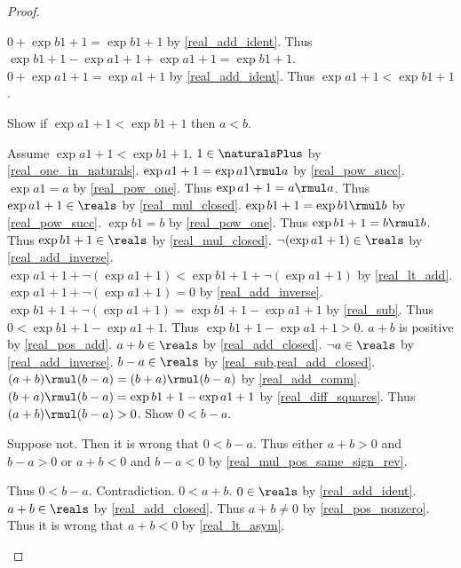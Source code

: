 \begin{proof}
\begin{subproof}
        $0 + \exp{b}{1+1} = \exp{b}{1+1}$ by \cref{real_add_ident}.
        Thus $\exp{b}{1+1} - \exp{a}{1+1} + \exp{a}{1+1} = \exp{b}{1+1}$.
        $0 + \exp{a}{1+1} = \exp{a}{1+1}$ by \cref{real_add_ident}.
        Thus $\exp{a}{1+1} < \exp{b}{1+1}$.
    \end{subproof}
    Show if $\exp{a}{1+1} < \exp{b}{1+1}$ then $a < b$.
    \begin{subproof}
        Assume $\exp{a}{1+1} < \exp{b}{1+1}$.
        $1\in\naturalsPlus$ by \cref{real_one_in_naturals}.
        $\exp{a}{1+1} = \exp{a}{1} \rmul a$ by \cref{real_pow_succ}.
        $\exp{a}{1} = a$ by \cref{real_pow_one}.
        Thus $\exp{a}{1+1} = a \rmul a$.
        Thus $\exp{a}{1+1}\in\reals$ by \cref{real_mul_closed}.
        $\exp{b}{1+1} = \exp{b}{1} \rmul b$ by \cref{real_pow_succ}.
        $\exp{b}{1} = b$ by \cref{real_pow_one}.
        Thus $\exp{b}{1+1} = b \rmul b$.
        Thus $\exp{b}{1+1}\in\reals$ by \cref{real_mul_closed}.
        $\neg{(\exp{a}{1+1})}\in\reals$ by \cref{real_add_inverse}.
        $\exp{a}{1+1} + \neg{(\exp{a}{1+1})} < \exp{b}{1+1} + \neg{(\exp{a}{1+1})}$ by \cref{real_lt_add}.
        $\exp{a}{1+1} + \neg{(\exp{a}{1+1})} = 0$ by \cref{real_add_inverse}.
        $\exp{b}{1+1} + \neg{(\exp{a}{1+1})} = \exp{b}{1+1} - \exp{a}{1+1}$ by \cref{real_sub}.
        Thus $0 < \exp{b}{1+1} - \exp{a}{1+1}$.
        Thus $\exp{b}{1+1} - \exp{a}{1+1} > 0$.
        $a + b$ is positive by \cref{real_pos_add}.
        $a + b\in\reals$ by \cref{real_add_closed}.
        $\neg{a}\in\reals$ by \cref{real_add_inverse}.
        $b - a\in\reals$ by \cref{real_sub,real_add_closed}.
        $(a + b) \rmul (b - a) = (b + a) \rmul (b - a)$ by \cref{real_add_comm}.
        $(b + a) \rmul (b - a) = \exp{b}{1+1} - \exp{a}{1+1}$ by \cref{real_diff_squares}.
        Thus $(a + b) \rmul (b - a) > 0$.
        Show $0 < b - a$.
        \begin{subproof}
            Suppose not.
            Then it is wrong that $0 < b - a$.
            Thus either $a + b > 0$ and $b - a > 0$ or $a + b < 0$ and $b - a < 0$ by \cref{real_mul_pos_same_sign_rev}.
            \begin{byCase}
                Thus $0 < b - a$.
                Contradiction.
                $0 < a + b$.
                $0\in\reals$ by \cref{real_add_ident}.
                $a + b\in\reals$ by \cref{real_add_closed}.
                Thus $a + b \neq 0$ by \cref{real_pos_nonzero}.
                Thus it is wrong that $a + b < 0$ by \cref{real_lt_asym}.

\end{byCase}
\end{subproof}
\end{subproof}
\end{proof}
